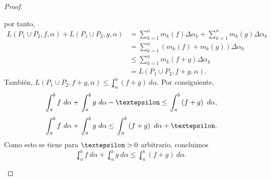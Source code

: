 \begin{proof}
\begin{itemize}
por tanto,
\begin{align*}
  L\left(P_1\cup P_2, f, \alpha\right)+L\left(P_1\cup P_2, g, \alpha\right)&=\sum_{k=1}^{n} m_k\left(f\right)\Delta\alpha_k+\sum_{k=1}^{n} m_k\left(g\right)\Delta\alpha_k\\
  &=\sum_{k=1}^{n} \left(m_k\left(f\right)+m_k\left(g\right)\right)\Delta\alpha_k\\
  &\leq \sum_{k=1}^{n} m_k\left(f+g\right)\Delta\alpha_k\\
  &=L\left(P_1\cup P_2, f+g, \alpha\right).
\end{align*}
También, $L\left(P_1\cup P_2, f+g, \alpha\right)\leq \lowint_a^b\left(f+g\right)\ d\alpha$. Por consiguiente,
\begin{equation*}
\lowint_a^b f\ d\alpha + \lowint_a^b g\ d\alpha - \text{\textepsilon} \leq \lowint_a^b \left(f+g\right)\ d\alpha,
\end{equation*}
\begin{equation*}
\lowint_a^b f\ d\alpha + \lowint_a^b g\ d\alpha \leq \lowint_a^b \left(f+g\right)\ d\alpha +  \text{\textepsilon}.
\end{equation*}
Como esto se tiene para $\text{\textepsilon}>0$ arbitrario, concluimos
\begin{equation*}
\lowint_a^b f\ d\alpha + \lowint_a^b g\ d\alpha \leq \lowint_a^b \left(f+g\right)\ d\alpha.
\end{equation*}
\end{itemize}

\end{proof}

